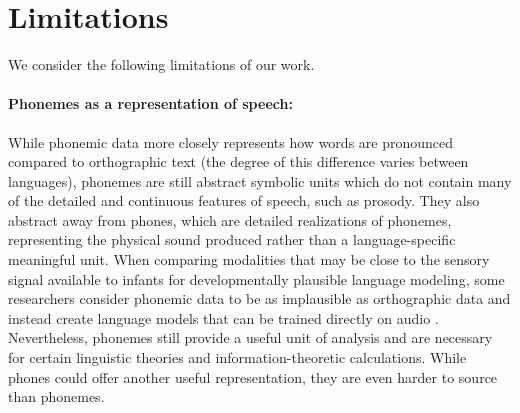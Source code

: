 \section{Limitations}\label{sec:13-limitations}


We consider the following limitations of our work. 

\paragraph{Phonemes as a representation of speech:} While phonemic data more closely represents how words are pronounced compared to orthographic text (the degree of this difference varies between languages), phonemes are still abstract symbolic units which do not contain many of the detailed and continuous features of speech, such as prosody. They also abstract away from phones, which are detailed realizations of phonemes, representing the physical sound produced rather than a language-specific meaningful unit. When comparing modalities that may be close to the sensory signal available to infants for developmentally plausible language modeling, some researchers consider phonemic data to be as implausible as orthographic data \citep{lavechin} and instead create language models that can be trained directly on audio \citep{kamper2017segmental, nguyen2020zero, hsu2021hubert, dunbar2021zero}. Nevertheless, phonemes still provide a useful unit of analysis and are necessary for certain linguistic theories and information-theoretic calculations. While phones could offer another useful representation, they are even harder to source than phonemes.

